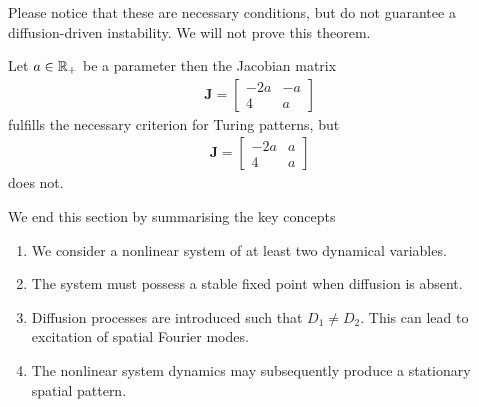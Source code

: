 \noindent Please notice that these are necessary conditions, but do not guarantee a diffusion-driven
instability. We will not prove this theorem.


\begin{example}
Let $a \in \mathbb{R}_+$ be a parameter then the Jacobian matrix 
\begin{eqnarray}
	\mathbf{J} = 
		\left[	\begin{matrix}
			-2a & -a \\
			4  & a 
		\end{matrix}
		\right]
\end{eqnarray}
fulfills the necessary criterion for Turing patterns, but 
\begin{eqnarray}
	\mathbf{J} = 
		\left[	\begin{matrix}
			-2a & a \\
			4  & a 
		\end{matrix}
		\right]
\end{eqnarray}
does not.
\end{example}

\noindent We end this section by summarising the key concepts  
\begin{enumerate}
	\item We consider a nonlinear system of at least two dynamical variables.
	\item The system must possess a stable fixed point when diffusion is absent.
	\item Diffusion processes are introduced such that $D_1 \neq D_2$. 
		This can lead to excitation of spatial Fourier modes.
	\item The nonlinear system dynamics may subsequently produce a stationary spatial pattern.
\end{enumerate}

